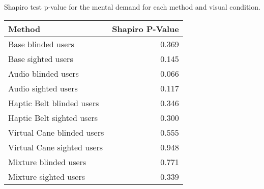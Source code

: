 
\centering
\caption{Shapiro test p-value for the mental demand for each method and visual condition.}
\label{tab:shapiro_mental_demand}
\begin{tabular}{lr}
\toprule
                    Method &  Shapiro P-Value \\
\midrule
        Base blinded users &            0.369 \\
        Base sighted users &            0.145 \\
       Audio blinded users &            0.066 \\
       Audio sighted users &            0.117 \\
 Haptic Belt blinded users &            0.346 \\
 Haptic Belt sighted users &            0.300 \\
Virtual Cane blinded users &            0.555 \\
Virtual Cane sighted users &            0.948 \\
     Mixture blinded users &            0.771 \\
     Mixture sighted users &            0.339 \\
\bottomrule
\end{tabular}

